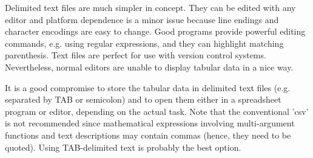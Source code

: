 \documentclass[times,onecolumn]{article}
\begin{document}
Delimited text files are much simpler in concept. They can be edited with any editor and platform dependence is a minor issue because line endings and character encodings are easy to change. Good programs provide powerful editing commands, e.g. using regular expressions, and they can highlight matching parenthesis. Text files are perfect for use with version control systems. Nevertheless, normal editors are unable to display tabular data in a nice way.

It is a good compromise to store the tabular data in delimited text files (e.g. separated by TAB or semicolon) and to open them either in a spreadsheet program or editor, depending on the actual task. Note that the conventional 'csv' is not recommended since mathematical expressions involving multi-argument functions and text descriptions may contain commas (hence, they need to be quoted). Using TAB-delimited text is probably the best option.
\end{document}
